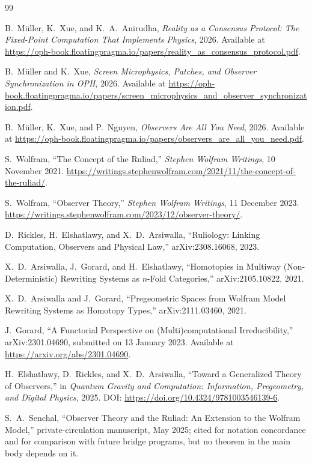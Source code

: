 \documentclass[11pt]{article}
\theoremstyle{remark}
\theoremstyle{plain}
\begin{document}
\begin{thebibliography}{99}

B.~M\"uller, K.~Xue, and K.~A.~Anirudha,
\emph{Reality as a Consensus Protocol: The Fixed-Point Computation That Implements Physics},
2026.
Available at \url{https://oph-book.floatingpragma.io/papers/reality_as_consensus_protocol.pdf}.

B.~M\"uller and K.~Xue,
\emph{Screen Microphysics, Patches, and Observer Synchronization in OPH},
2026.
Available at \url{https://oph-book.floatingpragma.io/papers/screen_microphysics_and_observer_synchronization.pdf}.

B.~M\"uller, K.~Xue, and P.~Nguyen,
\emph{Observers Are All You Need},
2026.
Available at \url{https://oph-book.floatingpragma.io/papers/observers_are_all_you_need.pdf}.

S.~Wolfram,
``The Concept of the Ruliad,''
\emph{Stephen Wolfram Writings}, 10 November 2021.
\url{https://writings.stephenwolfram.com/2021/11/the-concept-of-the-ruliad/}.

S.~Wolfram,
``Observer Theory,''
\emph{Stephen Wolfram Writings}, 11 December 2023.
\url{https://writings.stephenwolfram.com/2023/12/observer-theory/}.

D.~Rickles, H.~Elshatlawy, and X.~D.~Arsiwalla,
``Ruliology: Linking Computation, Observers and Physical Law,''
arXiv:2308.16068, 2023.

X.~D.~Arsiwalla, J.~Gorard, and H.~Elshatlawy,
``Homotopies in Multiway (Non-Deterministic) Rewriting Systems as \(n\)-Fold Categories,''
arXiv:2105.10822, 2021.

X.~D.~Arsiwalla and J.~Gorard,
``Pregeometric Spaces from Wolfram Model Rewriting Systems as Homotopy Types,''
arXiv:2111.03460, 2021.

J.~Gorard,
``A Functorial Perspective on (Multi)computational Irreducibility,''
arXiv:2301.04690, submitted on 13 January 2023.
Available at \url{https://arxiv.org/abs/2301.04690}.

H.~Elshatlawy, D.~Rickles, and X.~D.~Arsiwalla,
``Toward a Generalized Theory of Observers,''
in \emph{Quantum Gravity and Computation: Information, Pregeometry, and Digital Physics},
2025.
DOI: \url{https://doi.org/10.4324/9781003546139-6}.

S.~A.~Senchal,
``Observer Theory and the Ruliad: An Extension to the Wolfram Model,''
private-circulation manuscript, May 2025; cited for notation concordance and for comparison with future bridge programs, but no theorem in the main body depends on it.

\end{thebibliography}
\end{document}
